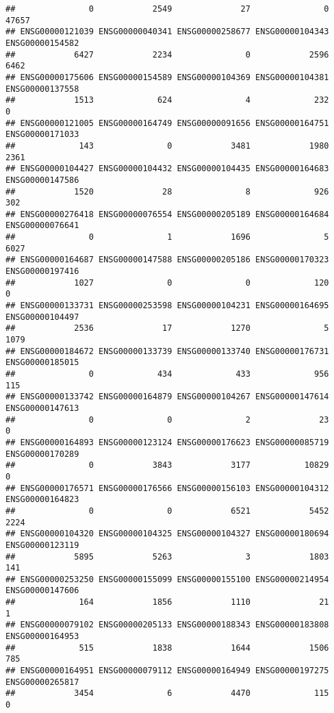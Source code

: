 \documentclass[
]{article}
\begin{document}
\begin{verbatim}
##               0            2549              27               0           47657 
## ENSG00000121039 ENSG00000040341 ENSG00000258677 ENSG00000104343 ENSG00000154582 
##            6427            2234               0            2596            6462 
## ENSG00000175606 ENSG00000154589 ENSG00000104369 ENSG00000104381 ENSG00000137558 
##            1513             624               4             232               0 
## ENSG00000121005 ENSG00000164749 ENSG00000091656 ENSG00000164751 ENSG00000171033 
##             143               0            3481            1980            2361 
## ENSG00000104427 ENSG00000104432 ENSG00000104435 ENSG00000164683 ENSG00000147586 
##            1520              28               8             926             302 
## ENSG00000276418 ENSG00000076554 ENSG00000205189 ENSG00000164684 ENSG00000076641 
##               0               1            1696               5            6027 
## ENSG00000164687 ENSG00000147588 ENSG00000205186 ENSG00000170323 ENSG00000197416 
##            1027               0               0             120               0 
## ENSG00000133731 ENSG00000253598 ENSG00000104231 ENSG00000164695 ENSG00000104497 
##            2536              17            1270               5            1079 
## ENSG00000184672 ENSG00000133739 ENSG00000133740 ENSG00000176731 ENSG00000185015 
##               0             434             433             956             115 
## ENSG00000133742 ENSG00000164879 ENSG00000104267 ENSG00000147614 ENSG00000147613 
##               0               0               2              23               0 
## ENSG00000164893 ENSG00000123124 ENSG00000176623 ENSG00000085719 ENSG00000170289 
##               0            3843            3177           10829               0 
## ENSG00000176571 ENSG00000176566 ENSG00000156103 ENSG00000104312 ENSG00000164823 
##               0               0            6521            5452            2224 
## ENSG00000104320 ENSG00000104325 ENSG00000104327 ENSG00000180694 ENSG00000123119 
##            5895            5263               3            1803             141 
## ENSG00000253250 ENSG00000155099 ENSG00000155100 ENSG00000214954 ENSG00000147606 
##             164            1856            1110              21               1 
## ENSG00000079102 ENSG00000205133 ENSG00000188343 ENSG00000183808 ENSG00000164953 
##             515            1838            1644            1506             785 
## ENSG00000164951 ENSG00000079112 ENSG00000164949 ENSG00000197275 ENSG00000265817 
##            3454               6            4470             115               0 

\end{verbatim}
\end{document}
